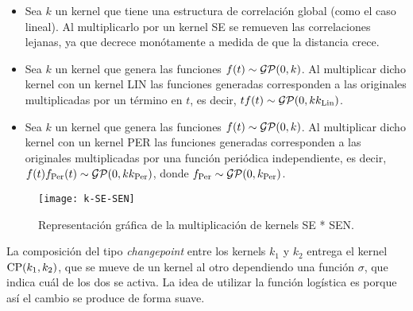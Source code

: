 \begin{itemize}
	\item Sea \(k\) un kernel que tiene una estructura de correlación global (como el caso lineal). Al multiplicarlo por un kernel SE se remueven las correlaciones lejanas, ya que decrece monótamente a medida de que la distancia crece.
	\item Sea \(k\) un kernel que genera las funciones \(f(t) \sim \operatorname{\mathcal{GP}}(0, k)\). Al multiplicar dicho kernel con un kernel LIN las funciones generadas corresponden a las originales multiplicadas por un término en \(t\), es decir, \(t f(t) \sim \operatorname{\mathcal{GP}}(0, k k_{\mathrm{Lin}})\).
	\item Sea \(k\) un kernel que genera las funciones \(f(t) \sim \operatorname{\mathcal{GP}}(0, k)\). Al multiplicar dicho kernel con un kernel PER las funciones generadas corresponden a las originales multiplicadas por una función periódica independiente, es decir, \(f(t) f_{\mathrm{Per}}(t) \sim \operatorname{\mathcal{GP}}(0, k k_{\mathrm{Per}})\), donde \(f_{\mathrm{Per}} \sim \operatorname{\mathcal{GP}}(0, k_{\mathrm{Per}})\).
\end{itemize}

\begin{figure}[h]
	\centering
	\texttt{[image: k-SE-SEN]}
	\caption{Representación gráfica de la multiplicación de kernels SE * SEN.}
\end{figure}

La composición del tipo \emph{changepoint} entre los kernels \(k_{1}\) y \(k_{2}\) entrega el kernel \(\operatorname{CP}(k_{1}, k_{2})\), que se mueve de un kernel al otro dependiendo una función \(\sigma\), que indica cuál de los dos se activa. La idea de utilizar la función logística es porque así el cambio se produce de forma suave.

